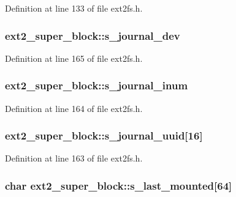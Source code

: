 \-Definition at line 133 of file ext2fs.\-h.

\hypertarget{structext2__super__block_a5c65ec434f4b1394d6ec68fb8d055a4e}{
\subsubsection[{s\-\_\-journal\-\_\-dev}]{ {\bf ext2\-\_\-super\-\_\-block\-::s\-\_\-journal\-\_\-dev}}}\label{structext2__super__block_a5c65ec434f4b1394d6ec68fb8d055a4e}


\-Definition at line 165 of file ext2fs.\-h.

\hypertarget{structext2__super__block_a593535b5ffb1b5480f887e0aae0be698}{
\subsubsection[{s\-\_\-journal\-\_\-inum}]{ {\bf ext2\-\_\-super\-\_\-block\-::s\-\_\-journal\-\_\-inum}}}\label{structext2__super__block_a593535b5ffb1b5480f887e0aae0be698}


\-Definition at line 164 of file ext2fs.\-h.

\hypertarget{structext2__super__block_a31f78875053afe2073c72ab700e831cd}{
\subsubsection[{s\-\_\-journal\-\_\-uuid}]{ {\bf ext2\-\_\-super\-\_\-block\-::s\-\_\-journal\-\_\-uuid}\mbox{[}16\mbox{]}}}\label{structext2__super__block_a31f78875053afe2073c72ab700e831cd}


\-Definition at line 163 of file ext2fs.\-h.

\hypertarget{structext2__super__block_ad2849dfeab713d00ddd93c97eaf80cea}{
\subsubsection[{s\-\_\-last\-\_\-mounted}]{\setlength{\rightskip}{0pt plus 5cm}char {\bf ext2\-\_\-super\-\_\-block\-::s\-\_\-last\-\_\-mounted}\mbox{[}64\mbox{]}}}\label{structext2__super__block_ad2849dfeab713d00ddd93c97eaf80cea}


